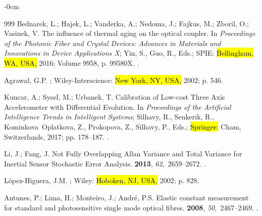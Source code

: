 \documentclass[sensors,article,accept,pdftex,moreauthors]{Definitions/mdpi}
\begin{document}
\begin{adjustwidth}{-\extralength}{0cm}
\begin{thebibliography}{999}
Bednarek, L.; Hajek, L.; Vanderka, A.; Nedoma, J.; Fajkus, M.; Zboril, O.; Vasinek, V.
\newblock The influence of thermal aging on the optical coupler.
\newblock In \emph{Proceedings of the Photonic Fiber and Crystal Devices: Advances in Materials and Innovations in Device Applications X}; Yin, S., Guo, R., Eds.; SPIE: \hl{Bellingham, WA, USA,}  2016; Volume 9958, p. 99580X.
.

Agrawal, G.P.
; Wiley-Interscience: \hl{New York, NY, USA, } 2002; p. 546.

Kuncar, A.; Sysel, M.; Urbanek, T.
\newblock Calibration of Low-cost Three Axis Accelerometer with Differential Evolution.
\newblock In \emph{Proceedings of the Artificial Intelligence Trends in Intelligent Systems}; Silhavy, R., Senkerik, R., Kominkova~Oplatkova, Z., Prokopova, Z., Silhavy, P., Eds.; \hl{Springer:} Cham, Switzerlands, 2017; pp. 178--187.
.



Li, J.; Fang, J.
\newblock Not Fully Overlapping Allan Variance and Total Variance for Inertial Sensor Stochastic Error Analysis.
 {\bf 2013}, {\em 62},~2659--2672.
.

L{\'{o}}pez-Higuera, J.M.
; Wiley:  \hl{Hoboken, NJ, USA,} %
 2002; p. 828.

Antunes, P.; Lima, H.; Monteiro, J.; Andr{\'{e}}, P.S.
\newblock Elastic constant measurement for standard and photosensitive single mode optical fibres.
 {\bf 2008}, {\em 50},~2467--2469.
.


\end{thebibliography}
\end{adjustwidth}
\end{document}
